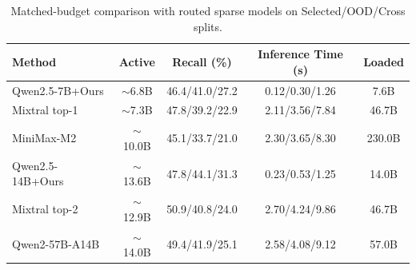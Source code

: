 \begin{table}[t]
\centering
\scriptsize
\setlength{\tabcolsep}{2pt}
\caption{Matched-budget comparison with routed sparse models on Selected/OOD/Cross splits.}
\vspace{-2mm}
\label{tab:moe_comparison}
\begin{tabular}{@{}lcccc@{}}
\toprule
Method & Active & Recall (\%) & Inference Time (s) & Loaded \\
\midrule
\rowcolor{icmlblue}
Qwen2.5-7B+Ours & $\sim$6.8B & 46.4/41.0/27.2 & 0.12/0.30/1.26 & 7.6B \\
Mixtral top-1 & $\sim$7.3B & 47.8/39.2/22.9 & 2.11/3.56/7.84 & 46.7B \\
MiniMax-M2 & $\sim$10.0B & 45.1/33.7/21.0 & 2.30/3.65/8.30 & 230.0B \\
\rowcolor{icmlblue}
Qwen2.5-14B+Ours & $\sim$13.6B & 47.8/44.1/31.3 & 0.23/0.53/1.25 & 14.0B \\
Mixtral top-2 & $\sim$12.9B & 50.9/40.8/24.0 & 2.70/4.24/9.86 & 46.7B \\
Qwen2-57B-A14B & $\sim$14.0B & 49.4/41.9/25.1 & 2.58/4.08/9.12 & 57.0B \\
\bottomrule
\end{tabular}
\vspace{-2mm}
\end{table}